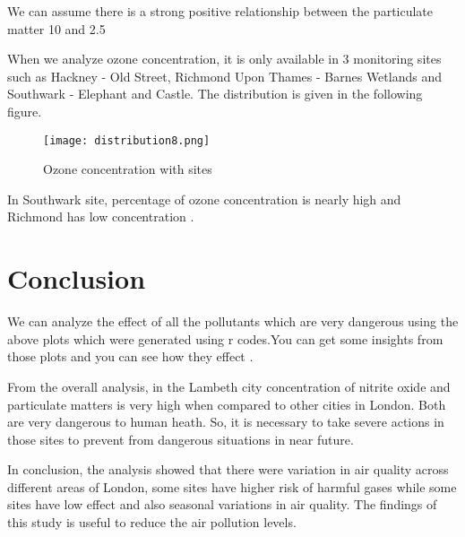 \documentclass[20pt]{article}
\begin{document}
We can assume there is a strong positive relationship between the particulate matter 10 and 2.5

When we analyze ozone concentration, it is only available in 3 monitoring sites such as Hackney - Old Street, Richmond Upon Thames - Barnes Wetlands and Southwark - Elephant and Castle.
The distribution is given in the following figure.
\begin{figure}[h]
	\centering
	\texttt{[image: distribution8.png]}	
	\caption{Ozone concentration with sites}
	\label{Figure_7}
\end{figure}

In Southwark site, percentage of ozone concentration is nearly high and Richmond has low concentration .

\newpage
\section{Conclusion}
\large We can analyze the effect of all the pollutants which are very dangerous using the above plots which were generated using r codes.You can get some insights from those plots and you can see how they effect .

From the overall analysis, in the Lambeth city concentration of nitrite oxide and particulate matters is very high when compared to other cities in London. Both are very dangerous to human heath. So, it is necessary to take severe actions in those sites to prevent from dangerous situations in near future.

In conclusion, the analysis showed that there were variation in air quality across different areas of London, some sites have higher risk of harmful gases while some sites have low effect  and also seasonal variations in air quality. The findings of this study is useful to reduce the air pollution levels.
\end{document}
